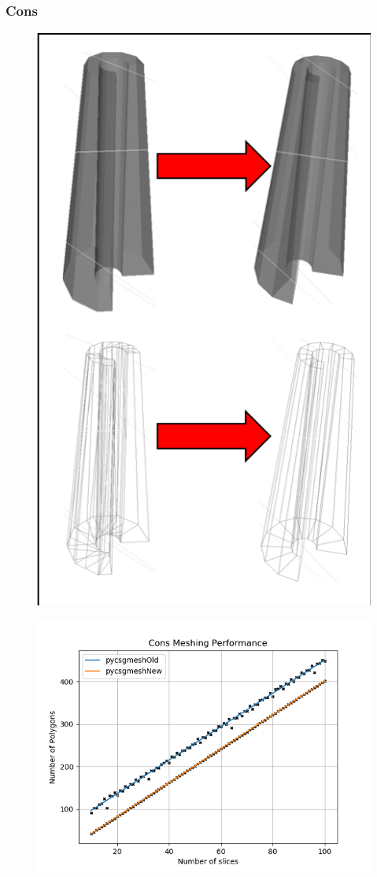 \documentclass[12pt,a4paper]{article}
\begin{document}
\subsubsection{Cons}
\begin{figure}[h!]
\centering
\begin{minipage}{.2\textwidth}
  \centering
  \includegraphics[height=1\linewidth]{Images//Meshes//cons.png}
  \label{fig:test1}
\end{minipage}%
\begin{minipage}{.3\textwidth}
  \centering
  \includegraphics[scale=0.35]{Images//Quad_fits//Cons_quad.png}
  \label{fig:test2}
\end{minipage}%
\end{figure}
\end{document}
